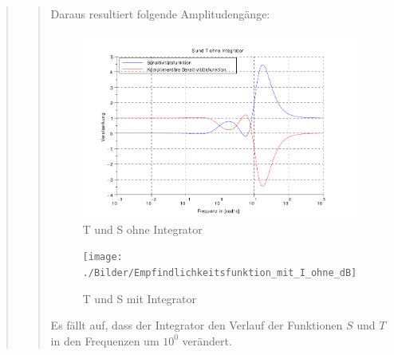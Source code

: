 \begin{quote}
\begin{quote}
        
        Daraus resultiert folgende Amplitudengänge:        
        \begin{figure}[H]
        \centering
            \includegraphics[scale=0.7, trim = 0cm 0cm 0cm 0cm, clip]{./Bilder/Empfindlichkeitsfunktion_ohne_I_ohne_dB}
                \caption{T und S ohne Integrator}
        \end{figure}
    
        \begin{figure}[H]
        \centering
            \texttt{[image: ./Bilder/Empfindlichkeitsfunktion\_mit\_I\_ohne\_dB]}
                \caption{T und S mit Integrator}
        \end{figure}        
    
        Es fällt auf, dass der Integrator den Verlauf der Funktionen $S$ und $T$ in den Frequenzen um $10^0$
        verändert.\\
        

        
        
        
         \end{quote}  %
    
\end{quote} %






